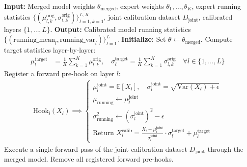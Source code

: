 \documentclass{article}
\theoremstyle{plain}
\theoremstyle{definition}
\theoremstyle{remark}
\begin{document}
\begin{algorithm}[htbp]
\caption{Sequential Hook-Based Activation Calibration (Hook-TAAC)}
\label{alg:hook-taac}
\begin{algorithmic}[1]
\STATE \textbf{Input:} Merged model weights $\theta_{\text{merged}}$, expert weights $\theta_1, \dots, \theta_K$, expert running statistics $\{(\mu_{l,k}^{\text{orig}}, \sigma_{l,k}^{\text{orig}})\}_{l=1, k=1}^{L, K}$, joint calibration dataset $D_{\text{joint}}$, calibrated layers $\{1, \dots, L\}$.
\STATE \textbf{Output:} Calibrated model running statistics $\{(\text{running\_mean}_l, \text{running\_var}_l)\}_{l=1}^L$.
\STATE \textbf{Initialize:} Set $\theta \leftarrow \theta_{\text{merged}}$. Compute target statistics layer-by-layer:
\begin{align*}
\mu_l^{\text{target}} &= \frac{1}{K} \sum_{k=1}^K \mu_{l,k}^{\text{orig}}, \quad \sigma_l^{\text{target}} = \frac{1}{K} \sum_{k=1}^K \sigma_{l,k}^{\text{orig}} \quad \forall l \in \{1, \dots, L\}
\end{align*}
\STATE Register a forward pre-hook on layer $l$:
\begin{align*}
\text{Hook}_l(X_l) \implies \begin{cases}
\mu_{l}^{\text{joint}} = \mathbb{E}[X_l], \quad \sigma_{l}^{\text{joint}} = \sqrt{\text{Var}(X_l) + \epsilon} \\
\mu_{\text{running}} \leftarrow \mu_{l}^{\text{joint}} \\
\sigma^2_{\text{running}} \leftarrow (\sigma_{l}^{\text{joint}})^2 - \epsilon \\
\text{Return } X_l^{\text{calib}} = \frac{X_l - \mu_{l}^{\text{joint}}}{\sigma_{l}^{\text{joint}}} \cdot \sigma_l^{\text{target}} + \mu_l^{\text{target}}
\end{cases}
\end{align*}
\ENDFOR
\STATE Execute a single forward pass of the joint calibration dataset $D_{\text{joint}}$ through the merged model.
\STATE Remove all registered forward pre-hooks.
\end{algorithmic}
\end{algorithm}
\end{document}
